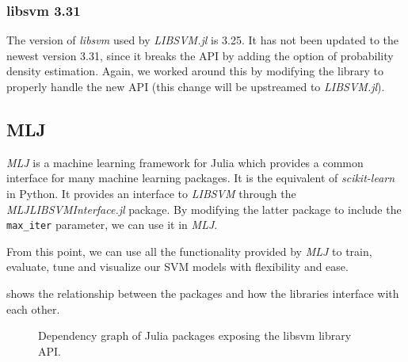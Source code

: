 \subsubsection{libsvm 3.31}

The version of \emph{libsvm} used by \emph{LIBSVM.jl} is 3.25. It has not been
updated to the newest version 3.31, since it breaks the API by adding the option
of probability density estimation. Again, we worked around this by modifying the
library to properly handle the new API (this change will be upstreamed to
\emph{LIBSVM.jl}). %

\subsection{MLJ}

\emph{MLJ} \cite{blaomMLJJuliaPackage2020} is a machine learning framework for
Julia which provides a common interface for many machine learning packages. It
is the equivalent of \emph{scikit-learn} in Python. It provides an interface to
\emph{LIBSVM} through the \emph{MLJLIBSVMInterface.jl} package. By modifying
the latter package to include the \texttt{max\_iter} parameter, we can use it in
\emph{MLJ}.

From this point, we can use all the functionality provided by \emph{MLJ} to
train, evaluate, tune and visualize our SVM models with flexibility and ease.

 shows the relationship between the packages and how
the libraries interface with each other.

\begin{figure}[H]
    \caption{Dependency graph of Julia packages exposing the libsvm library API.}
    \label{fig:julia_libsvm_deps}
\end{figure}

